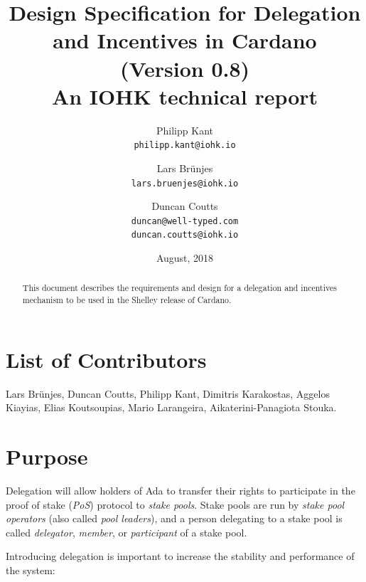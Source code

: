 \documentclass[11pt,a4paper]{article}
\begin{document}
\title{Design Specification for Delegation and Incentives in Cardano \\
       {\small (Version 0.8)} \\
       {\large \sc An IOHK technical report}}

\author{Philipp Kant   \\ {\small \texttt{philipp.kant@iohk.io}} \\
   \and Lars Br\"unjes \\ {\small \texttt{lars.bruenjes@iohk.io}} \\
   \and Duncan Coutts  \\ {\small \texttt{duncan@well-typed.com}} \\
                          {\small \texttt{duncan.coutts@iohk.io}}}
\date{August, 2018}

\maketitle

\begin{abstract}
This document describes the requirements and design for a delegation and
incentives mechanism to be used in the Shelley release of Cardano.
\end{abstract}

\section*{List of Contributors}
\label{acknowledgements}

Lars Br\"unjes, Duncan Coutts, Philipp Kant,
Dimitris Karakostas, Aggelos Kiayias, Elias Koutsoupias, Mario
Larangeira, Aikaterini-Panagiota Stouka.

\tableofcontents
\listoffigures
\listoftodos

\section{Purpose}
\label{purpose}

Delegation will allow holders of Ada to transfer their rights to
participate in the proof of stake (\emph{PoS}) protocol to \emph{stake
pools}. Stake pools are run by \emph{stake pool operators} (also called
\emph{pool leaders}), and a person delegating to a stake pool is called
\emph{delegator}, \emph{member}, or \emph{participant} of a stake pool.

Introducing delegation is important to increase the stability and
performance of the system:
\end{document}
